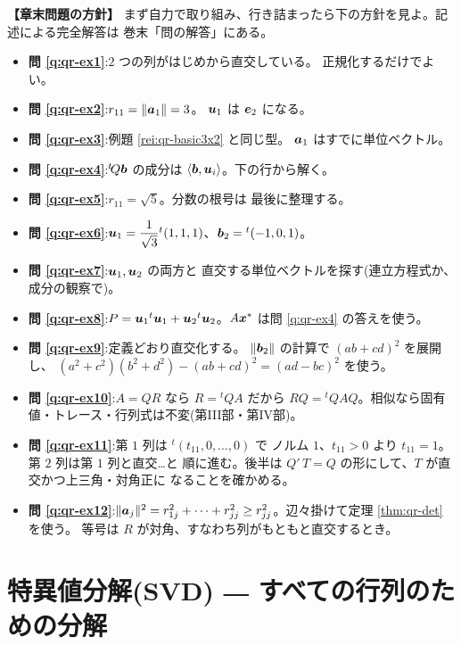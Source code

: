 \bigskip
{\small
\noindent\textbf{【章末問題の方針】}\quad
まず自力で取り組み、行き詰まったら下の方針を見よ。記述による完全解答は
巻末「問の解答」にある。
\begin{itemize}
\item \textbf{問 \ref{q:qr-ex1}}:$2$ つの列がはじめから直交している。
正規化するだけでよい。
\item \textbf{問 \ref{q:qr-ex2}}:$r_{11} = \|\bm{a}_1\| = 3$。
$\bm{u}_1$ は $\bm{e}_2$ になる。
\item \textbf{問 \ref{q:qr-ex3}}:例題 \ref{rei:qr-basic3x2} と同じ型。
$\bm{a}_1$ はすでに単位ベクトル。
\item \textbf{問 \ref{q:qr-ex4}}:${}^t\!Q\bm{b}$ の成分は
$\langle \bm{b}, \bm{u}_i \rangle$。下の行から解く。
\item \textbf{問 \ref{q:qr-ex5}}:$r_{11} = \sqrt{5}$。分数の根号は
最後に整理する。
\item \textbf{問 \ref{q:qr-ex6}}:$\bm{u}_1 = \dfrac{1}{\sqrt{3}}
{}^t(1,1,1)$、$\bm{b}_2 = {}^t(-1, 0, 1)$。
\item \textbf{問 \ref{q:qr-ex7}}:$\bm{u}_1, \bm{u}_2$ の両方と
直交する単位ベクトルを探す(連立方程式か、成分の観察で)。
\item \textbf{問 \ref{q:qr-ex8}}:$P = \bm{u}_1{}^t\bm{u}_1 +
\bm{u}_2{}^t\bm{u}_2$。$A\bm{x}^*$ は問 \ref{q:qr-ex4} の答えを使う。
\item \textbf{問 \ref{q:qr-ex9}}:定義どおり直交化する。
$\|\bm{b}_2\|$ の計算で $(ab + cd)^2$ を展開し、
$(a^2 + c^2)(b^2 + d^2) - (ab + cd)^2 = (ad - bc)^2$ を使う。
\item \textbf{問 \ref{q:qr-ex10}}:$A = QR$ なら $R = {}^t\!QA$ だから
$RQ = {}^t\!QAQ$。相似なら固有値・トレース・行列式は不変(第III部・第IV部)。
\item \textbf{問 \ref{q:qr-ex11}}:第 $1$ 列は ${}^t(t_{11}, 0, \dots, 0)$ で
ノルム $1$、$t_{11} > 0$ より $t_{11} = 1$。第 $2$ 列は第 $1$ 列と直交…と
順に進む。後半は $Q' \,T = Q$ の形にして、$T$ が直交かつ上三角・対角正に
なることを確かめる。
\item \textbf{問 \ref{q:qr-ex12}}:$\|\bm{a}_j\|^2 = r_{1j}^2 + \cdots
+ r_{jj}^2 \ge r_{jj}^2$。辺々掛けて定理 \ref{thm:qr-det} を使う。
等号は $R$ が対角、すなわち列がもともと直交するとき。
\end{itemize}
}

\chapter{特異値分解(SVD) ― すべての行列のための分解}\label{chap:svd}

